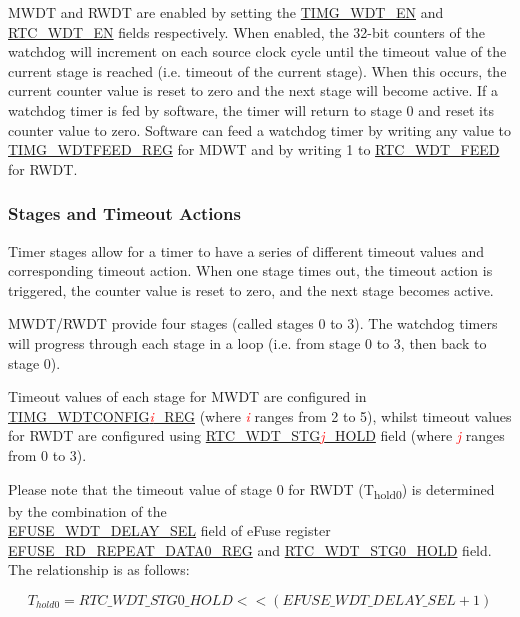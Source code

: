 \documentclass[main\_\_EN.tex]{subfiles}
\begin{document}
MWDT and RWDT are enabled by setting the \hyperref[fielddesc:TIMGWDTEN]{TIMG\_WDT\_EN} and  \hyperref[fielddesc:RTCWDTEN]{RTC\_WDT\_EN} fields respectively. When enabled, the 32-bit counters of the watchdog will increment on each source clock cycle until the timeout value of the current stage is reached (i.e. timeout of the current stage). When this occurs, the current counter value is reset to zero and the next stage will become active. If a watchdog timer is fed by software, the timer will return to stage 0 and reset its counter value to zero. Software can feed a watchdog timer by writing any value to \hyperref[regdesc:TIMGWDTFEEDREG]{TIMG\_WDTFEED\_REG} for MDWT and by writing 1 to \hyperref[fielddesc:RTCWDTRTCWDTFEED]{RTC\_WDT\_FEED} for RWDT.


\subsubsection{Stages and Timeout Actions}\label{sec:wdt-timeout}
Timer stages allow for a timer to have a series of different timeout values and corresponding timeout action. When one stage times out, the timeout action is triggered, the counter value is reset to zero, and the next stage becomes active.

MWDT/RWDT provide four stages (called stages 0 to 3). The watchdog timers will progress through each stage in a loop (i.e. from stage 0 to 3, then back to stage 0).

Timeout values of each stage for MWDT are configured in \hyperref[regdesc:TIMGWDTCONFIG2REG]{TIMG\_WDTCONFIG\textcolor{red}{\it{i}}\_REG} (where \textcolor{red}{\it{i}} ranges from 2 to 5), whilst timeout values for RWDT are configured using \hyperref[fielddesc:RTCWDTSTG3HOLD]{RTC\_WDT\_STG\textcolor{red}{\it{j}}\_HOLD} field (where \textcolor{red}{\it{j}} ranges from 0 to 3).

Please note that the timeout value of stage 0 for RWDT (T\textsubscript{hold0}) is determined by the combination of the \\ \hyperref[fielddesc:EFUSEWDTDELAYSEL]{EFUSE\_WDT\_DELAY\_SEL} field of eFuse register \hyperref[regdesc:EFUSERDREPEATDATA0REG]{EFUSE\_RD\_REPEAT\_DATA0\_REG} and  \hyperref[fielddesc:RTCWDTSTG0HOLD]{RTC\_WDT\_STG0\_HOLD} field. The relationship is as follows:

\begin{displaymath}
T_{hold0} = \hyperref[fielddesc:RTCWDTSTG0HOLD]{RTC\_WDT\_STG0\_HOLD}   << (\hyperref[fielddesc:EFUSEWDTDELAYSEL]{EFUSE\_WDT\_DELAY\_SEL} + 1)
\end{displaymath}
\end{document}
